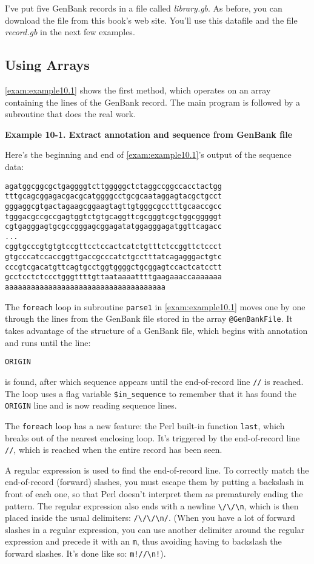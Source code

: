 I've put five GenBank records in a file called \textit{library.gb}. As before, you can download the file from this book's web site. You'll use this datafile and the file \textit{record.gb} in the next few examples. 

\subsection{Using Arrays}
\autoref{exam:example10.1} shows the first method, which operates on an array containing the lines of the GenBank record. The main program is followed by a subroutine that does the real work. 

\textbf{Example 10-1. Extract annotation and sequence from GenBank file}


Here's the beginning and end of \autoref{exam:example10.1}'s output of the sequence data:

\begin{lstlisting}
agatggcggcgctgaggggtcttgggggctctaggccggccacctactgg
tttgcagcggagacgacgcatggggcctgcgcaataggagtacgctgcct
gggaggcgtgactagaagcggaagtagttgtgggcgcctttgcaaccgcc
tgggacgccgccgagtggtctgtgcaggttcgcgggtcgctggcgggggt
cgtgagggagtgcgccgggagcggagatatggagggagatggttcagacc
...
cggtgcccgtgtgtccgttcctccactcatctgtttctccggttctccct
gtgcccatccaccggttgaccgcccatctgcctttatcagagggactgtc
cccgtcgacatgttcagtgcctggtggggctgcggagtccactcatcctt
gcctcctctccctgggttttgttaataaaattttgaagaaaccaaaaaaa
aaaaaaaaaaaaaaaaaaaaaaaaaaaaaaaaaaaaa
\end{lstlisting}

The \verb|foreach| loop in subroutine \verb|parse1| in \autoref{exam:example10.1} moves one by one through the lines from the GenBank file stored in the array \verb|@GenBankFile|. It takes advantage of the structure of a GenBank file, which begins with annotation and runs until the line:

\verb|ORIGIN|

is found, after which sequence appears until the end-of-record line \verb|//| is reached. The loop uses a flag variable \verb|$in_sequence| to remember that it has found the \verb|ORIGIN| line and is now reading sequence lines. 

The \verb|foreach| loop has a new feature: the Perl built-in function \verb|last|, which breaks out of the nearest enclosing loop. It's triggered by the end-of-record line \verb|//|, which is reached when the entire record has been seen.

A regular expression is used to find the end-of-record line. To correctly match the end-of-record (forward) slashes, you must escape them by putting a backslash in front of each one, so that Perl doesn't interpret them as prematurely ending the pattern. The regular expression also ends with a newline \verb|\/\/\n|, which is then placed inside the usual delimiters: \verb|/\/\/\n/|. (When you have a lot of forward slashes in a regular expression, you can use another delimiter around the regular expression and precede it with an \verb|m|, thus avoiding having to backslash the forward slashes. It's done like so: \verb|m!//\n!|). 

